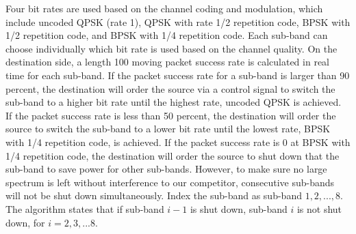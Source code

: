 Four bit rates are used based on the channel coding and modulation, which include uncoded QPSK (rate 1), QPSK with rate 1/2 repetition code, BPSK with 1/2 repetition code, and BPSK with 1/4 repetition code. Each sub-band can choose individually which bit rate is used based on the channel quality. On the destination side, a length 100 moving packet success rate is calculated in real time for each sub-band. If the packet success rate for a sub-band is larger than 90 percent, the destination will order the source via a control signal to switch the sub-band to a higher bit rate until the highest rate, uncoded QPSK is achieved. If the packet success rate is less than 50 percent, the destination will order the source to switch the sub-band to a lower bit rate until the lowest rate, BPSK with 1/4 repetition code, is achieved. If the packet success rate is 0 at BPSK with 1/4 repetition code, the destination will order the source to shut down that the sub-band to save power for other sub-bands. However, to make sure no large spectrum is left without interference to our competitor, consecutive sub-bands will not be shut down simultaneously. Index the sub-band as sub-band $1,2,...,8$. The algorithm states that if sub-band $i-1$ is shut down, sub-band $i$ is not shut down, for $i=2,3,...8$.



